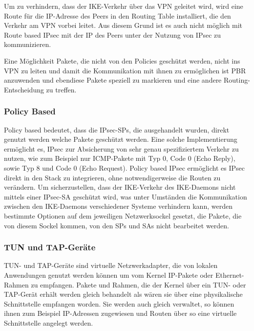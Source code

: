Um zu verhindern, dass der \ac{IKE}-Verkehr über das \ac{VPN} geleitet wird, wird
eine Route für die \ac{IP}-Adresse des Peers in den Routing Table installiert,
die den Verkehr am \ac{VPN} vorbei leitet. Aus diesem Grund ist es auch nicht möglich
mit Route based \ac{IPsec} mit der \ac{IP} des Peers unter der Nutzung von \ac{IPsec} zu kommunizieren.

Eine Möglichkeit Pakete, die nicht von den Policies geschützt werden, nicht ins \ac{VPN} zu leiten und
damit die Kommunikation mit ihnen zu ermöglichen ist \ac{PBR} anzuwenden und ebendiese Pakete
speziell zu markieren und eine andere Routing-Entscheidung zu treffen.

\subsubsection{Policy Based}
\label{subsec:policybased}
Policy based bedeutet, dass die \ac{IPsec}-\acp{SP}, die ausgehandelt wurden, direkt genutzt werden welche Pakete geschützt werden.
Eine solche Implementierung ermöglicht es, \ac{IPsec} zur Absicherung von sehr genau spezifiziertem
Verkehr zu nutzen, wie zum Beispiel nur \ac{ICMP}-Pakete mit Typ 0, Code 0 (Echo Reply), sowie Typ 8 und Code 0 (Echo Request).
Policy based \ac{IPsec} ermöglicht es \ac{IPsec} direkt in den Stack zu integrieren, ohne notwendigerweise die Routen zu verändern.
Um sicherzustellen, dass der \ac{IKE}-Verkehr des \ac{IKE}-Daemons nicht mittels einer \ac{IPsec}-\ac{SA} geschützt wird, was
unter Umständen die Kommunikation zwischen den \ac{IKE}-Daemons verschiedener Systeme verhindern kann, werden bestimmte
Optionen auf dem jeweiligen Netzwerksockel gesetzt, die Pakete, die von diesem Sockel kommen, von den \acp{SP} und \acp{SA}
nicht bearbeitet werden.



\subsubsection{TUN und TAP-Geräte}
TUN- und TAP-Geräte sind virtuelle Netzwerkadapter, die von lokalen Anwendungen
genutzt werden können um vom Kernel \ac{IP}-Pakete oder Ethernet-Rahmen zu empfangen.
Pakete und Rahmen, die der Kernel über ein TUN- oder TAP-Gerät erhält
werden gleich behandelt als wären sie über eine physikalische Schnittstelle empfangen worden.
Sie werden auch gleich verwaltet, so können ihnen zum Beispiel \ac{IP}-Adressen zugewiesen
und Routen über so eine virtuelle Schnittstelle angelegt werden.

